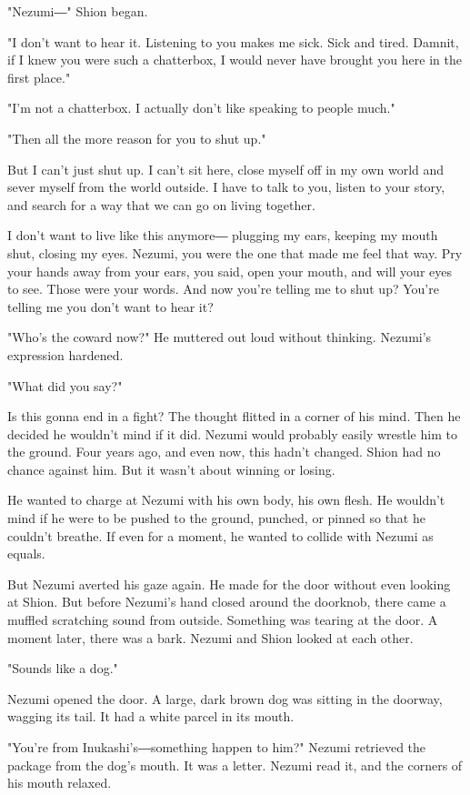 "Nezumi―" Shion began.

"I don't want to hear it. Listening to you makes me sick. Sick and
tired. Damnit, if I knew you were such a chatterbox, I would never have
brought you here in the first place."

"I'm not a chatterbox. I actually don't like speaking to people much."

"Then all the more reason for you to shut up."

But I can't just shut up. I can't sit here, close myself off in my own
world and sever myself from the world outside. I have to talk to you,
listen to your story, and search for a way that we can go on living
together.

I don't want to live like this anymore― plugging my ears, keeping my
mouth shut, closing my eyes. Nezumi, you were the one that made me feel
that way. Pry your hands away from your ears, you said, open your mouth,
and will your eyes to see. Those were your words. And now you're telling
me to shut up? You're telling me you don't want to hear it?

"Who's the coward now?" He muttered out loud without thinking. Nezumi's
expression hardened.

"What did you say?"

Is this gonna end in a fight? The thought flitted in a corner of his
mind. Then he decided he wouldn't mind if it did. Nezumi would probably
easily wrestle him to the ground. Four years ago, and even now, this
hadn't changed. Shion had no chance against him. But it wasn't about
winning or losing.

He wanted to charge at Nezumi with his own body, his own flesh. He
wouldn't mind if he were to be pushed to the ground, punched, or pinned
so that he couldn't breathe. If even for a moment, he wanted to collide
with Nezumi as equals.

But Nezumi averted his gaze again. He made for the door without even
looking at Shion. But before Nezumi's hand closed around the doorknob,
there came a muffled scratching sound from outside. Something was
tearing at the door. A moment later, there was a bark. Nezumi and Shion
looked at each other.

"Sounds like a dog."

Nezumi opened the door. A large, dark brown dog was sitting in the
doorway, wagging its tail. It had a white parcel in its mouth.

"You're from Inukashi's―something happen to him?" Nezumi retrieved the
package from the dog's mouth. It was a letter. Nezumi read it, and the
corners of his mouth relaxed.


